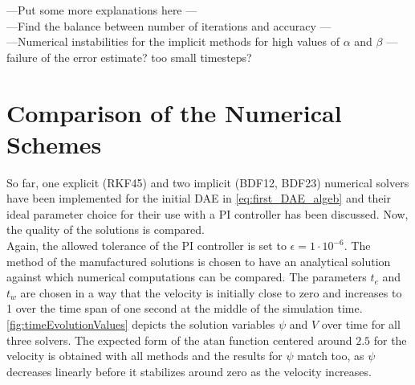 \documentclass{report}
\begin{document}
---Put some more explanations here --- \\
---Find the balance between number of iterations and accuracy --- \\
---Numerical instabilities for the implicit methods for high values of $\alpha$ and $\beta$ --- \\
failure of the error estimate? too small timesteps? \\ 

\section{Comparison of the Numerical Schemes}
So far, one explicit (RKF45) and two implicit (BDF12, BDF23) numerical solvers have been implemented for the initial DAE in \autoref{eq:first_DAE_algeb} and their ideal parameter choice for their use with a PI controller has been discussed. Now, the quality of the solutions is compared. \\
Again, the allowed tolerance of the PI controller is set to $\epsilon=1\cdot 10^{-6}$. The method of the manufactured solutions is chosen to have an analytical solution against which numerical computations can be compared. The parameters $t_e$ and $t_w$ are chosen in a way that the velocity is initially close to zero and increases to 1 over the time span of one second at the middle of the simulation time. \autoref{fig:timeEvolutionValues} depicts the solution variables $\psi$ and $V$ over time for all three solvers. The expected form of the $\text{atan}$ function centered around $2.5$ for the velocity is obtained with all methods and the results for $\psi$ match too, as $\psi$ decreases linearly before it stabilizes around zero as the velocity increases. \\
\end{document}
